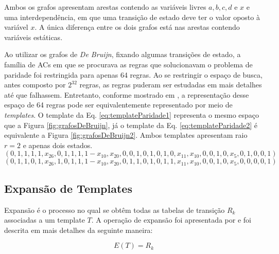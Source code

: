 Ambos os grafos apresentam arestas contendo as variáveis livres $a, b, c, d \text{ e } x$ e uma interdependência, em que uma transição de estado deve ter o valor oposto à variável $x$. A única diferença entre os dois grafos está nas arestas contendo variáveis estáticas.

Ao utilizar os grafos de \textit{De Bruijn}, fixando algumas transições de estado, a família de ACs em que se procurava as regras que solucionavam o problema de paridade foi restringida para apenas 64 regras. Ao se restringir o espaço de busca, antes composto por $2^{32}$ regras, as regras puderam ser estudadas em mais detalhes até que falhassem. Entretanto, conforme mostrado em \cite{Verardo2014}, a representação desse espaço de 64 regras pode ser equivalentemente representado por meio de \textit{templates}. O template da Eq. \eqref{eq:templateParidade1} representa o mesmo espaço que a Figura \ref{fig:grafosDeBruijn}, já o template da Eq. \eqref{eq:templateParidade2} é equivalente a Figura \ref{fig:grafosDeBruijn2}. Ambos templates apresentam raio $r=2$ e apenas dois estados.
\begin{equation}
\left(0,1,1,1,1,x_{26},0,1,1,1,1-x_{10},x_{20},0,0,1,0,1,0,1,0,x_{11},x_{10},0,0,1,0,x_5,0,1,0,0,1\right)
\label{eq:templateParidade1}
\end{equation}
\begin{equation}
\left(0,1,1,0,1,x_{26},1,0,1,1,1-x_{10},x_{20},0,1,1,0,1,0,1,1,x_{11},x_{10},0,0,1,0,x_5,0,0,0,0,1\right)
\label{eq:templateParidade2}
\end{equation}


\newpage\newpage
\subsection{Expansão de Templates}
Expansão é o processo no qual se obtêm todas as tabelas de transição $R_k$ associadas a um template $T$.
A operação de expansão foi apresentada por  e foi descrita em mais detalhes da seguinte maneira:

\begin{equation}
E(T)=R_k
\end{equation}

